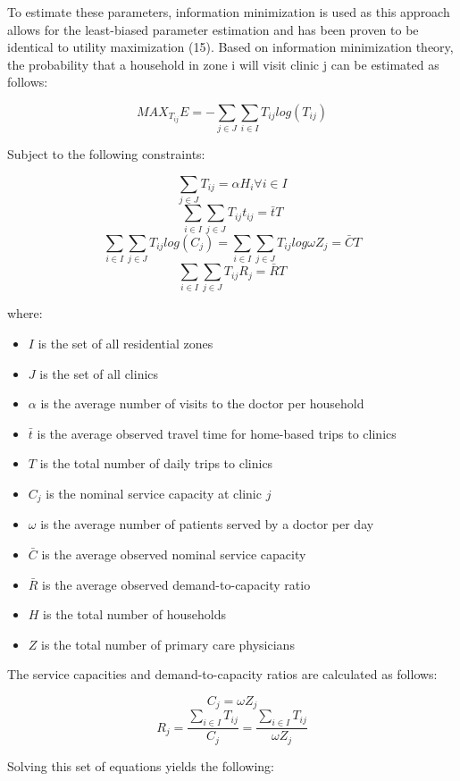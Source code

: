 \documentclass{article}
\begin{document}
To estimate these parameters, information minimization is used as this
approach allows for the least-biased parameter estimation and has been
proven to be identical to utility maximization (15). Based on
information minimization theory, the probability that a household in
zone i will visit clinic j can be estimated as follows:

\[
MAX_{T_{ij}} E = -\sum_{j \in J} \sum_{i \in I} T_{ij} log(T_{ij})
\]

Subject to the following constraints:

\[
\sum_{j \in J}T_{ij} = \alpha H_i \forall i \in I 
\] \[
\sum_{i \in I} \sum_{j \in J} T_{ij} t_{ij} = \bar{t}T 
\] \[
\sum_{i \in I} \sum_{j \in J} T_{ij} log(C_j) = \sum_{i \in I} \sum_{j \in J}T_{ij} log \omega Z_j = \bar{C}T 
\] \[
\sum_{i \in I} \sum_{j \in J} T_{ij} R_j = \bar{R}T
\]

where:

\begin{itemize}
\tightlist
\item
  \(I\) is the set of all residential zones
\item
  \(J\) is the set of all clinics
\item
  \(\alpha\) is the average number of visits to the doctor per household
\item
  \(\bar{t}\) is the average observed travel time for home-based trips
  to clinics
\item
  \(T\) is the total number of daily trips to clinics
\item
  \(C_j\) is the nominal service capacity at clinic \(j\)
\item
  \(\omega\) is the average number of patients served by a doctor per
  day
\item
  \(\bar{C}\) is the average observed nominal service capacity
\item
  \(\bar{R}\) is the average observed demand-to-capacity ratio
\item
  \(H\) is the total number of households
\item
  \(Z\) is the total number of primary care physicians
\end{itemize}

The service capacities and demand-to-capacity ratios are calculated as
follows:

\[
C_j = \omega Z_j
\] \[
R_j = \frac{\sum_{i \in I} T_{ij}}{C_j} = \frac{\sum_{i \in I} T_{ij}}{\omega Z_j}
\]

Solving this set of equations yields the following:
\end{document}
